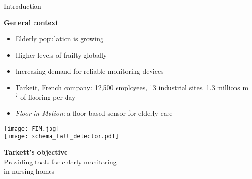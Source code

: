 \begin{frame}{Introduction}
\begin{minipage}[t]{0.48\linewidth}
    \vspace{0pt}
        \centering\textbf{General context}
        \begin{itemize}
            \item Elderly population is growing
            \item Higher levels of frailty globally
            \item Increasing demand for reliable monitoring devices
            \item Tarkett, French company: 12,500 employees, 13 industrial sites, 1.3 millions m$^2$ of flooring per day
            \item \emph{Floor in Motion}: a floor-based sensor for elderly care
        \end{itemize}
            \smallskip
            \texttt{[image: FIM.jpg]}\\[2pt]
            \texttt{[image: schema\_fall\_detector.pdf]}\\
    \pause
\end{minipage}\hfill
\begin{minipage}[t]{0.47\linewidth}
        \vspace{0pt}
        \centering\textbf{Tarkett's objective}\\
        \smallskip
        {\textcolor{myblue}{Providing tools for elderly monitoring\\ in nursing homes}}
    

\end{minipage}
\end{frame}
